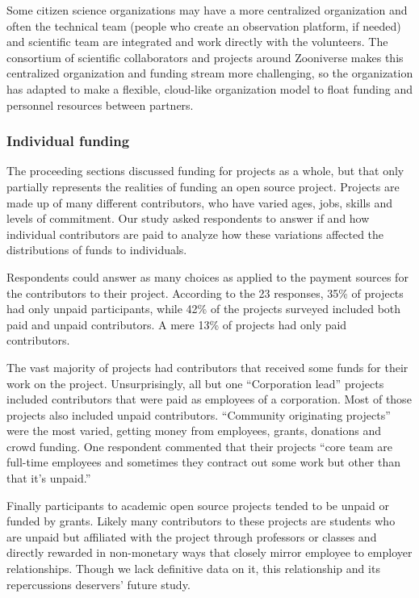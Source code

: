 Some citizen science organizations may have a more centralized organization and often the technical team (people who create an observation platform, if needed) and scientific team are integrated and work directly with the volunteers. The consortium of scientific collaborators and projects around Zooniverse makes this centralized organization and funding stream more challenging, so the organization has adapted to make a flexible, cloud-like organization model to float funding and personnel resources between partners.

\subsubsection{Individual funding}

The proceeding sections discussed funding for projects as a whole, but that only partially represents the realities of funding an open source project. Projects are made up of many different contributors, who have varied ages, jobs, skills and levels of commitment. Our study asked respondents to answer if and how individual contributors are paid to analyze how these variations affected the distributions of funds to individuals. 

Respondents could answer as many choices as applied to the payment sources for the contributors to their project. According to the 23 responses, 35\% of projects had only unpaid participants, while 42\% of the projects surveyed included both paid and unpaid contributors. A mere 13\% of projects had only paid contributors.

The vast majority of projects had contributors that received some funds for their work on the project. Unsurprisingly, all but one “Corporation lead” projects included contributors that were paid as employees of a corporation. Most of those projects also included unpaid contributors. “Community originating projects” were the most varied, getting money from employees, grants, donations and crowd funding. One respondent commented that their projects “core team are full-time employees and sometimes they contract out some work but other than that it's unpaid.”

Finally participants to academic open source projects tended to be unpaid or funded by grants. Likely many contributors to these projects are students who are unpaid but affiliated with the project through professors or classes and directly rewarded in non-monetary ways that closely mirror employee to employer relationships. Though we lack definitive data on it, this relationship and its repercussions deservers’ future study.